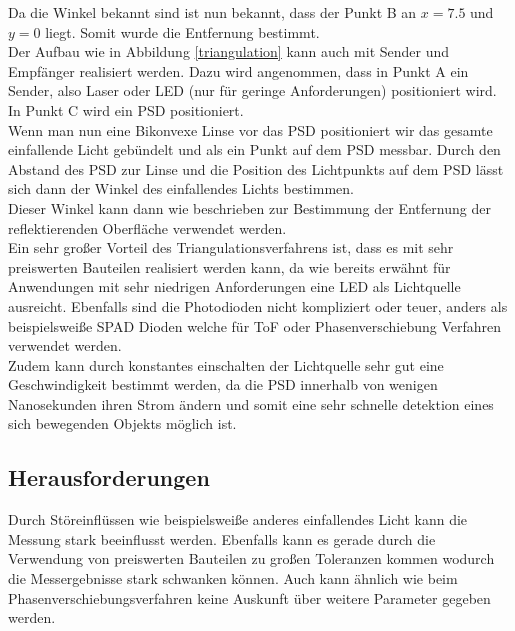 Da die Winkel bekannt sind ist nun bekannt, dass der Punkt B an $x = 7.5$ und $y = 0$ liegt. Somit wurde die Entfernung bestimmt.\\
Der Aufbau wie in Abbildung \ref{triangulation} kann auch mit Sender und Empfänger realisiert werden. Dazu wird angenommen, dass in Punkt A ein Sender, also Laser oder LED (nur für geringe Anforderungen) positioniert wird. In Punkt C wird ein \ac{PSD} positioniert.\\
Wenn man nun eine Bikonvexe Linse vor das \ac{PSD} positioniert wir das gesamte einfallende Licht gebündelt und als ein Punkt auf dem \ac{PSD} messbar.
Durch den Abstand des \ac{PSD} zur Linse und die Position des Lichtpunkts auf dem \ac{PSD} lässt sich dann der Winkel des einfallendes Lichts bestimmen.\\
Dieser Winkel kann dann wie beschrieben zur Bestimmung der Entfernung der reflektierenden Oberfläche verwendet werden. \\
Ein sehr großer Vorteil des Triangulationsverfahrens ist, dass es mit sehr preiswerten Bauteilen realisiert werden kann, da wie bereits erwähnt für Anwendungen mit sehr niedrigen Anforderungen eine \ac{LED} als Lichtquelle ausreicht. Ebenfalls sind die Photodioden nicht kompliziert oder teuer, anders als beispielsweiße \ac{SPAD} Dioden welche für \ac{ToF} oder Phasenverschiebung Verfahren verwendet werden.\\
Zudem kann durch konstantes einschalten der Lichtquelle sehr gut eine Geschwindigkeit bestimmt werden, da die \ac{PSD} innerhalb von wenigen Nanosekunden ihren Strom ändern und somit eine sehr schnelle detektion eines sich bewegenden Objekts möglich ist. \cite{triangulation}\cite{psd}
\subsection{Herausforderungen}
Durch Störeinflüssen wie beispielsweiße anderes einfallendes Licht kann die Messung stark beeinflusst werden. Ebenfalls kann es gerade durch die Verwendung von preiswerten Bauteilen zu großen Toleranzen kommen wodurch die Messergebnisse stark schwanken können. Auch kann ähnlich wie beim Phasenverschiebungsverfahren keine Auskunft über weitere Parameter gegeben werden. 